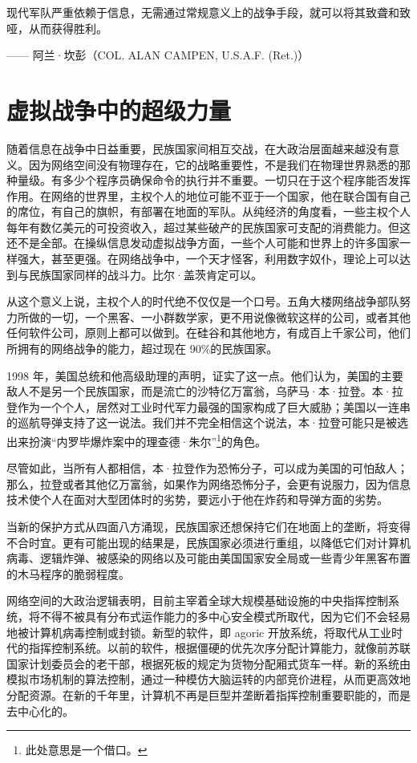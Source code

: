 \begin{tcolorbox}
\kaishu 现代军队严重依赖于信息，无需通过常规意义上的战争手段，就可以将其致聋和致哑，从而获得胜利。
\begin{flushright}
—— 阿兰·坎彭（COL. ALAN CAMPEN, U.S.A.F. (Ret.)）
\end{flushright}
\end{tcolorbox}


\section{虚拟战争中的超级力量}
随着信息在战争中日益重要，民族国家间相互交战，在大政治层面越来越没有意义。因为网络空间没有物理存在，它的战略重要性，不是我们在物理世界熟悉的那种量级。有多少个程序员确保命令的执行并不重要。一切只在于这个程序能否发挥作用。在网络的世界里，主权个人的地位可能不亚于一个国家，他在联合国有自己的席位，有自己的旗帜，有部署在地面的军队。从纯经济的角度看，一些主权个人每年有数亿美元的可投资收入，超过某些破产的民族国家可支配的消费能力。但这还不是全部。在操纵信息发动虚拟战争方面，一些个人可能和世界上的许多国家一样强大，甚至更强。在网络战争中，一个天才怪客，利用数字奴仆，理论上可以达到与民族国家同样的战斗力。比尔·盖茨肯定可以。

从这个意义上说，主权个人的时代绝不仅仅是一个口号。五角大楼网络战争部队努力所做的一切，一个黑客、一小群数学家，更不用说像微软这样的公司，或者其他任何软件公司，原则上都可以做到。在硅谷和其他地方，有成百上千家公司，他们所拥有的网络战争的能力，超过现在 90\%的民族国家。

1998 年，美国总统和他高级助理的声明，证实了这一点。他们认为，美国的主要敌人不是另一个民族国家，而是流亡的沙特亿万富翁，乌萨马·本·拉登。本·拉登作为一个个人，居然对工业时代军力最强的国家构成了巨大威胁；美国以一连串的巡航导弹支持了这一说法。我们并不完全相信这个说法，本·拉登可能只是被选出来扮演“内罗毕爆炸案中的理查德·朱尔”\footnote{此处意思是一个借口。}的角色。

尽管如此，当所有人都相信，本·拉登作为恐怖分子，可以成为美国的可怕敌人；那么，拉登或者其他亿万富翁，如果作为网络恐怖分子，会更有说服力，因为信息技术使个人在面对大型团体时的劣势，要远小于他在炸药和导弹方面的劣势。

当新的保护方式从四面八方涌现，民族国家还想保持它们在地面上的垄断，将变得不合时宜。更有可能出现的结果是，民族国家必须进行重组，以降低它们对计算机病毒、逻辑炸弹、被感染的网络以及可能由美国国家安全局或一些青少年黑客布置的木马程序的脆弱程度。

网络空间的大政治逻辑表明，目前主宰着全球大规模基础设施的中央指挥控制系统，将不得不被具有分布式运作能力的多中心安全模式所取代，因为它们不会轻易地被计算机病毒控制或封锁。新型的软件，即 agoric 开放系统，将取代从工业时代的指挥控制系统。以前的软件，根据僵硬的优先次序分配计算能力，就像前苏联国家计划委员会的老干部，根据死板的规定为货物分配厢式货车一样。新的系统由模拟市场机制的算法控制，通过一种模仿大脑运转的内部竞价进程，从而更高效地分配资源。在新的千年里，计算机不再是巨型并垄断着指挥控制重要职能的，而是去中心化的。

